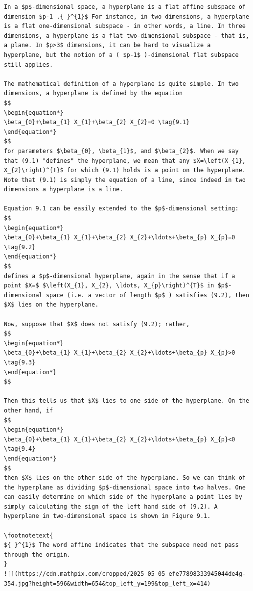 \documentclass[10pt]{article}
\let\svthefootnote\thefootnote
\newcommand\blfootnotetext[1]{%
  \let\thefootnote\relax\footnote{#1}%
  \addtocounter{footnote}{-1}%
  \let\thefootnote\svthefootnote%
}
\let\svfootnotetext\footnotetext
\renewcommand\footnotetext[2][?]{%
  \if\relax#1\relax%
    \ifnum\value{footnote}=0\blfootnotetext{#2}\else\svfootnotetext{#2}\fi%
  \else%
    \if?#1\ifnum\value{footnote}=0\blfootnotetext{#2}\else\svfootnotetext{#2}\fi%
    \else\svfootnotetext[#1]{#2}\fi%
  \fi
}
\begin{document}
\begin{verbatim}
In a $p$-dimensional space, a hyperplane is a flat affine subspace of dimension $p-1 .{ }^{1}$ For instance, in two dimensions, a hyperplane is a flat one-dimensional subspace - in other words, a line. In three dimensions, a hyperplane is a flat two-dimensional subspace - that is, a plane. In $p>3$ dimensions, it can be hard to visualize a hyperplane, but the notion of a ( $p-1$ )-dimensional flat subspace still applies.

The mathematical definition of a hyperplane is quite simple. In two dimensions, a hyperplane is defined by the equation
$$
\begin{equation*}
\beta_{0}+\beta_{1} X_{1}+\beta_{2} X_{2}=0 \tag{9.1}
\end{equation*}
$$
for parameters $\beta_{0}, \beta_{1}$, and $\beta_{2}$. When we say that (9.1) "defines" the hyperplane, we mean that any $X=\left(X_{1}, X_{2}\right)^{T}$ for which (9.1) holds is a point on the hyperplane. Note that (9.1) is simply the equation of a line, since indeed in two dimensions a hyperplane is a line.

Equation 9.1 can be easily extended to the $p$-dimensional setting:
$$
\begin{equation*}
\beta_{0}+\beta_{1} X_{1}+\beta_{2} X_{2}+\ldots+\beta_{p} X_{p}=0 \tag{9.2}
\end{equation*}
$$
defines a $p$-dimensional hyperplane, again in the sense that if a point $X=$ $\left(X_{1}, X_{2}, \ldots, X_{p}\right)^{T}$ in $p$-dimensional space (i.e. a vector of length $p$ ) satisfies (9.2), then $X$ lies on the hyperplane.

Now, suppose that $X$ does not satisfy (9.2); rather,
$$
\begin{equation*}
\beta_{0}+\beta_{1} X_{1}+\beta_{2} X_{2}+\ldots+\beta_{p} X_{p}>0 \tag{9.3}
\end{equation*}
$$

Then this tells us that $X$ lies to one side of the hyperplane. On the other hand, if
$$
\begin{equation*}
\beta_{0}+\beta_{1} X_{1}+\beta_{2} X_{2}+\ldots+\beta_{p} X_{p}<0 \tag{9.4}
\end{equation*}
$$
then $X$ lies on the other side of the hyperplane. So we can think of the hyperplane as dividing $p$-dimensional space into two halves. One can easily determine on which side of the hyperplane a point lies by simply calculating the sign of the left hand side of (9.2). A hyperplane in two-dimensional space is shown in Figure 9.1.

\footnotetext{
${ }^{1}$ The word affine indicates that the subspace need not pass through the origin.
}
![](https://cdn.mathpix.com/cropped/2025_05_05_efe77898333945044de4g-354.jpg?height=596&width=654&top_left_y=199&top_left_x=414)


\end{verbatim}
\end{document}
